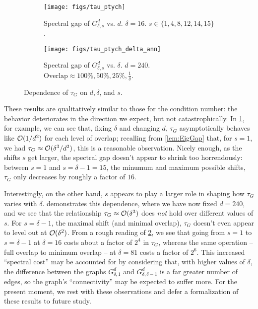 \begin{figure}[htb]
  \centering
  \begin{subfigure}[b]{.49\textwidth}
    \centering
      \texttt{[image: figs/tau\_ptych]}
    \caption{Spectral gap of $G_{\delta, s}^d$ vs. $d$.  $\delta = 16$.  $s \in \{1, 4, 8, 12, 14, 15\}$.}
    \label{fig:tau_ptych_d}
  \end{subfigure}
  \hfill
  \begin{subfigure}[b]{.49\textwidth}
    \centering
      \texttt{[image: figs/tau\_ptych\_delta\_ann]}
    \caption{Spectral gap of $G_{\delta, s}^d$ vs. $\delta$.  $d = 240$.  $\text{Overlap} \approx 100\%, 50\%, 25\%, \frac{1}{\delta}$.}
    \label{fig:tau_ptych_delta}
  \end{subfigure}
  \caption{Dependence of $\tau_G$ on $d, \delta$, and $s$.}
  \label{fig:tau_ptych}
\end{figure}

These results are qualitatively similar to those for the condition number: the behavior deteriorates in the direction we expect, but not catastrophically.  In \cref{fig:tau_ptych_d}, for example, we can see that, fixing $\delta$ and changing $d$, $\tau_G$ asymptotically behaves like $\mathcal{O}(1 / d^2)$ for each level of overlap; recalling from \cref{lem:EigGap} that, for $s = 1$, we had $\tau_G \approx \mathcal{O}(\delta^3 / d^2)$, this is a reasonable observation.  Nicely enough, as the shifts $s$ get larger, the spectral gap doesn't appear to shrink too horrendously: between $s = 1$ and $s = \delta - 1 = 15$, the minumum and maximum possible shifts, $\tau_G$ only decreases by roughly a factor of $16$.

Interestingly, on the other hand, $s$ appears to play a larger role in shaping how $\tau_G$ varies with $\delta$.   demonstrates this dependence, where we have now fixed $d = 240$, and we see that the relationship $\tau_G \approx \mathcal{O}(\delta^3)$ does \emph{not} hold over different values of $s$.  For $s = \delta - 1$, the maximal shift (and minimal overlap), $\tau_G$ doesn't even appear to level out at $\mathcal{O}(\delta^2)$.  From a rough reading of \cref{fig:tau_ptych_delta}, we see that going from $s = 1$ to $s = \delta - 1$ at $\delta = 16$ costs about a factor of $2^4$ in $\tau_G$, whereas the same operation -- full overlap to minimum overlap -- at $\delta = 81$ costs a factor of $2^6$.  This increased ``spectral cost'' may be accounted for by considering that, with higher values of $\delta$, the difference between the graphs $G_{\delta, 1}^d$ and $G_{\delta, \delta - 1}^d$ is a far greater number of edges, so the graph's ``connectivity'' may be expected to suffer more.  For the present moment, we rest with these observations and defer a formalization of these results to future study.


